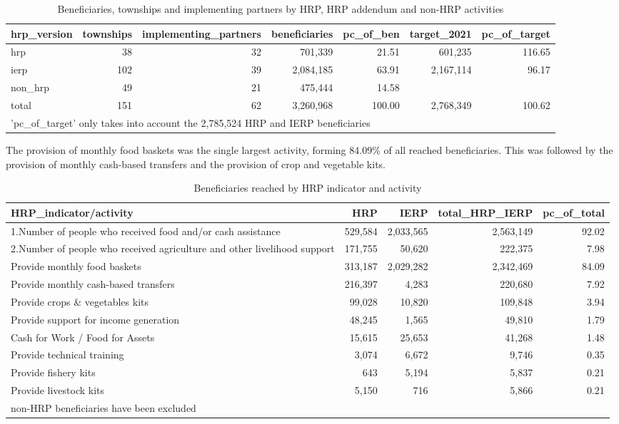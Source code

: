 \documentclass[
]{article}
\begin{document}
\begin{table}

\caption{\label{tab:hrp-version-table}Beneficiaries, townships and implementing partners by HRP, HRP addendum and non-HRP activities}
\centering
\begin{tabular}[t]{l|r|r|r|r|r|r}
\hline
hrp\_version & townships & implementing\_partners & beneficiaries & pc\_of\_ben & target\_2021 & pc\_of\_target\\
\hline
hrp & 38 & 32 & 701,339 & 21.51 & 601,235 & 116.65\\
\hline
ierp & 102 & 39 & 2,084,185 & 63.91 & 2,167,114 & 96.17\\
\hline
non\_hrp & 49 & 21 & 475,444 & 14.58 &  & \\
\hline
total & 151 & 62 & 3,260,968 & 100.00 & 2,768,349 & 100.62\\
\hline
\multicolumn{7}{l}{\rule{0pt}{1em}'pc\_of\_target' only takes into account the 2,785,524 HRP and IERP beneficiaries}\\
\end{tabular}
\end{table}

The provision of monthly food baskets was the single largest activity,
forming 84.09\% of all reached beneficiaries. This was followed by the
provision of monthly cash-based transfers and the provision of crop and
vegetable kits.

\begin{table}

\caption{\label{tab:barplot-hrp-ierp-activities}Beneficiaries reached by HRP indicator and activity}
\centering
\begin{tabular}[t]{l|r|r|r|r}
\hline
HRP\_indicator/activity & HRP & IERP & total\_HRP\_IERP & pc\_of\_total\\
\hline
1.Number of people who received food and/or cash assistance & 529,584 & 2,033,565 & 2,563,149 & 92.02\\
\hline
2.Number of people who received agriculture and other livelihood support & 171,755 & 50,620 & 222,375 & 7.98\\
\hline
Provide monthly food baskets & 313,187 & 2,029,282 & 2,342,469 & 84.09\\
\hline
Provide monthly cash-based transfers & 216,397 & 4,283 & 220,680 & 7.92\\
\hline
Provide crops \& vegetables kits & 99,028 & 10,820 & 109,848 & 3.94\\
\hline
Provide support for income generation & 48,245 & 1,565 & 49,810 & 1.79\\
\hline
Cash for Work / Food for Assets & 15,615 & 25,653 & 41,268 & 1.48\\
\hline
Provide technical training & 3,074 & 6,672 & 9,746 & 0.35\\
\hline
Provide fishery kits & 643 & 5,194 & 5,837 & 0.21\\
\hline
Provide livestock kits & 5,150 & 716 & 5,866 & 0.21\\
\hline
\multicolumn{5}{l}{\rule{0pt}{1em}non-HRP beneficiaries have been excluded}\\
\end{tabular}
\end{table}
\end{document}
